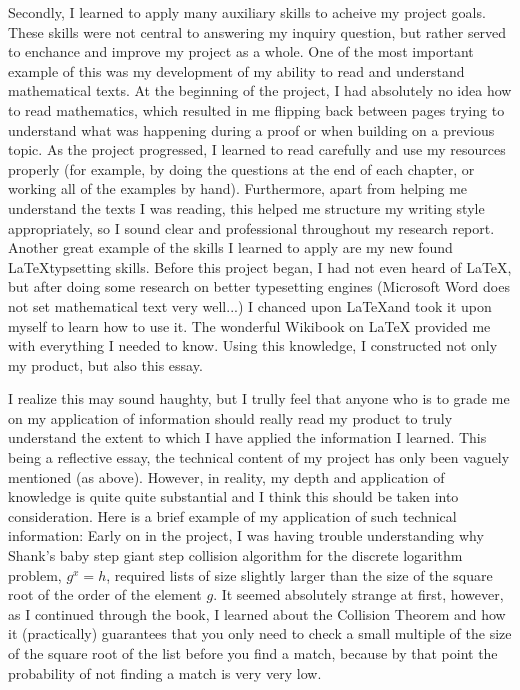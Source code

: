 \documentclass[12pt, a4paper, draft]{report}
\begin{document}
Secondly, I learned to apply many auxiliary skills to acheive my project
goals. These skills were not central to answering my inquiry question, but
rather served to enchance and improve my project as a whole. One of the
most important example of this was my development of my ability to read
and understand mathematical texts. At the beginning of the project, I had
absolutely no idea how to read mathematics, which resulted in me flipping
back between pages trying to understand what was happening during a proof
or when building on a previous topic. As the project progressed, I learned
to read carefully and use my resources properly (for example, by doing
the questions at the end of each chapter, or working all of the examples
by hand). Furthermore, apart from helping me understand the texts I was
reading, this helped me structure my writing style appropriately, so I
sound clear and professional throughout my research report. Another great
example of the skills I learned to apply are my new found \LaTeX typsetting
skills. Before this project began, I had not even heard of \LaTeX,
but after doing some research on better typesetting engines (Microsoft Word
does not set mathematical text very well...) I chanced upon \LaTeX and took
it upon myself to learn how to use it. The wonderful Wikibook on \LaTeX
provided me with everything I needed to know. Using this knowledge, I
constructed not only my product, but also this essay.

I realize this may sound haughty, but I trully feel that anyone who is to
grade me on my application of information should really read my product to
truly understand the extent to which I have applied the information I
learned. This being a reflective essay, the technical content of my project
has only been vaguely mentioned (as above). However, in reality, my depth
and application of knowledge is quite quite substantial and I think this
should be taken into consideration. Here is a brief example of my
application of such technical information: Early on in the project, I was
having trouble understanding why Shank's baby step giant step collision
algorithm for the discrete logarithm problem, $g^x = h$, required lists of
size slightly larger than the size of the square root of the order of the
element $g$. It seemed absolutely strange at first, however, as I continued
through the book, I learned about the Collision Theorem and how it
(practically) guarantees that you only need to check a small multiple of
the size of the square root of the list before you find a match, because
by that point the probability of not finding a match is very very low.
\end{document}

